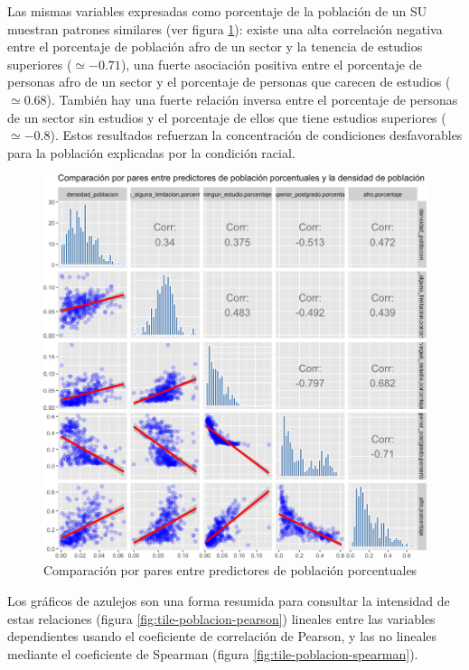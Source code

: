 \documentclass[12pt,a4paper,oneside, openany]{book}
\theoremstyle{definition}
\theoremstyle{definition}
\theoremstyle{definition}
\theoremstyle{remark}
\begin{document}
Las mismas variables expresadas como porcentaje de la población de un SU
muestran patrones similares (ver figura \ref{fig:bivar-poblacion-mod}):
existe una alta correlación negativa entre el porcentaje de población
afro de un sector y la tenencia de estudios superiores
(\(\simeq-0.71\)), una fuerte asociación positiva entre el porcentaje de
personas afro de un sector y el porcentaje de personas que carecen de
estudios (\(\simeq 0.68\)). También hay una fuerte relación inversa
entre el porcentaje de personas de un sector sin estudios y el
porcentaje de ellos que tiene estudios superiores (\(\simeq-0.8\)).
Estos resultados refuerzan la concentración de condiciones desfavorables
para la población explicadas por la condición racial.

\begin{figure}[H]

{\centering \includegraphics[width=1\linewidth]{tesis-unigis_files/figure-latex/bivar-poblacion-mod-1} 

}

\caption{Comparación por pares entre predictores de población porcentuales}\label{fig:bivar-poblacion-mod}
\end{figure}

Los gráficos de azulejos son una forma resumida para consultar la
intensidad de estas relaciones (figura \ref{fig:tile-poblacion-pearson})
lineales entre las variables dependientes usando el coeficiente de
correlación de Pearson, y las no lineales mediante el coeficiente de
Spearman (figura \ref{fig:tile-poblacion-spearman}).
\end{document}
